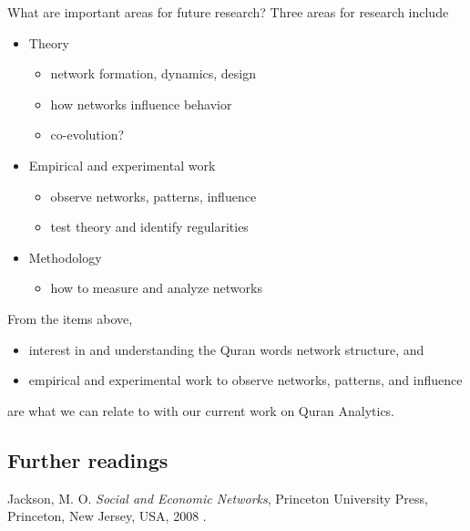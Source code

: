 \documentclass[
]{article}
\providecommand{\tightlist}{%
  \setlength{\itemsep}{0pt}\setlength{\parskip}{0pt}}
\begin{document}
What are important areas for future research? Three areas for research include

\begin{itemize}
\tightlist
\item
  Theory

  \begin{itemize}
  \tightlist
  \item
    network formation, dynamics, design\\
  \item
    how networks influence behavior\\
  \item
    co-evolution?
  \end{itemize}
\item
  Empirical and experimental work

  \begin{itemize}
  \tightlist
  \item
    observe networks, patterns, influence\\
  \item
    test theory and identify regularities\\
  \end{itemize}
\item
  Methodology

  \begin{itemize}
  \tightlist
  \item
    how to measure and analyze networks
  \end{itemize}
\end{itemize}

From the items above,

\begin{itemize}
\tightlist
\item
  interest in and understanding the Quran words network structure, and
\item
  empirical and experimental work to observe networks, patterns, and influence
\end{itemize}

are what we can relate to with our current work on Quran Analytics.

\hypertarget{further-readings-5}{%
\subsection{Further readings}\label{further-readings-5}}

Jackson, M. O. \emph{Social and Economic Networks}, Princeton University Press, Princeton, New Jersey, USA, 2008 \citep{jackson2008}.
\end{document}
